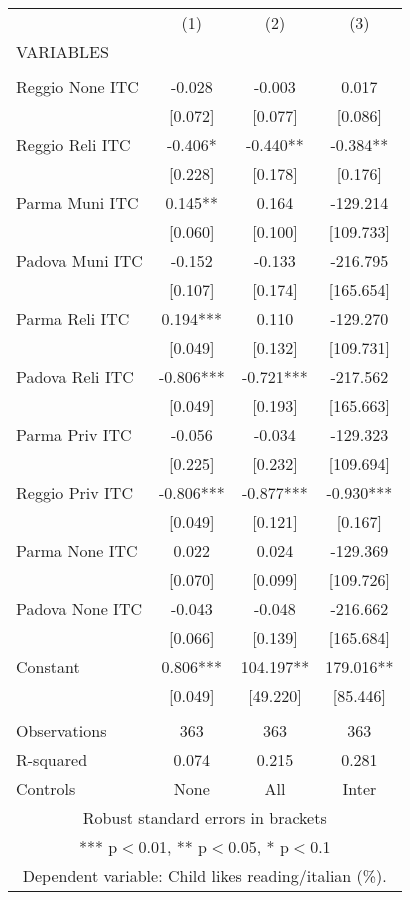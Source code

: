 \begin{tabular}{lccc} \hline
 & (1) & (2) & (3) \\
VARIABLES &  &  &  \\ \hline
 &  &  &  \\
Reggio None ITC & -0.028 & -0.003 & 0.017 \\
 & [0.072] & [0.077] & [0.086] \\
Reggio Reli ITC & -0.406* & -0.440** & -0.384** \\
 & [0.228] & [0.178] & [0.176] \\
Parma Muni ITC & 0.145** & 0.164 & -129.214 \\
 & [0.060] & [0.100] & [109.733] \\
Padova Muni ITC & -0.152 & -0.133 & -216.795 \\
 & [0.107] & [0.174] & [165.654] \\
Parma Reli ITC & 0.194*** & 0.110 & -129.270 \\
 & [0.049] & [0.132] & [109.731] \\
Padova Reli ITC & -0.806*** & -0.721*** & -217.562 \\
 & [0.049] & [0.193] & [165.663] \\
Parma Priv ITC & -0.056 & -0.034 & -129.323 \\
 & [0.225] & [0.232] & [109.694] \\
Reggio Priv ITC & -0.806*** & -0.877*** & -0.930*** \\
 & [0.049] & [0.121] & [0.167] \\
Parma None ITC & 0.022 & 0.024 & -129.369 \\
 & [0.070] & [0.099] & [109.726] \\
Padova None ITC & -0.043 & -0.048 & -216.662 \\
 & [0.066] & [0.139] & [165.684] \\
Constant & 0.806*** & 104.197** & 179.016** \\
 & [0.049] & [49.220] & [85.446] \\
 &  &  &  \\
Observations & 363 & 363 & 363 \\
R-squared & 0.074 & 0.215 & 0.281 \\
 Controls & None & All & Inter \\ \hline
\multicolumn{4}{c}{ Robust standard errors in brackets} \\
\multicolumn{4}{c}{ *** p$<$0.01, ** p$<$0.05, * p$<$0.1} \\
\multicolumn{4}{c}{ Dependent variable: Child likes reading/italian (\%).} \\
\end{tabular}
